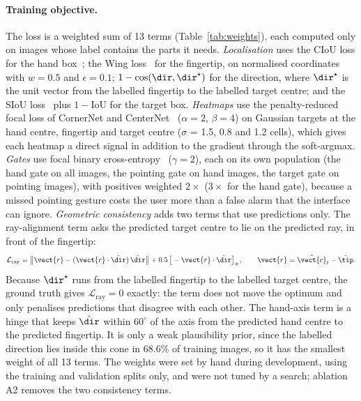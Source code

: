 \paragraph{Training objective.} The loss is a weighted sum of 13 terms (Table~\ref{tab:weights}), each computed only on images whose label contains the parts it needs. \emph{Localisation} uses the CIoU loss for the hand box~\cite{zheng2020distance}; the Wing loss~\cite{feng2018wing} for the fingertip, on normalised coordinates with $w{=}0.5$ and $\epsilon{=}0.1$; $1-\cos(\dir,\dir^\star)$ for the direction, where $\dir^\star$ is the unit vector from the labelled fingertip to the labelled target centre; and the SIoU loss~\cite{gevorgyan2022siou} plus $1-\mathrm{IoU}$ for the target box. \emph{Heatmaps} use the penalty-reduced focal loss of CornerNet and CenterNet~\cite{law2018cornernet,zhou2019objects} ($\alpha{=}2$, $\beta{=}4$) on Gaussian targets at the hand centre, fingertip and target centre ($\sigma$ = 1.5, 0.8 and 1.2 cells), which gives each heatmap a direct signal in addition to the gradient through the soft-argmax. \emph{Gates} use focal binary cross-entropy~\cite{lin2017focal} ($\gamma{=}2$), each on its own population (the hand gate on all images, the pointing gate on hand images, the target gate on pointing images), with positives weighted $2\times$ ($3\times$ for the hand gate), because a missed pointing gesture costs the user more than a false alarm that the interface can ignore. \emph{Geometric consistency} adds two terms that use predictions only. The ray-alignment term asks the predicted target centre to lie on the predicted ray, in front of the fingertip:
\begin{equation}
\mathcal{L}_{\mathrm{ray}} = \big\|\vect{r}-(\vect{r}\cdot\hat{\dir})\,\hat{\dir}\big\| + 0.5\,\big[-\vect{r}\cdot\hat{\dir}\big]_+,\qquad \vect{r}=\hat{\vect{c}}_t-\hat{\tip}.
\end{equation}
Because $\dir^\star$ runs from the labelled fingertip to the labelled target centre, the ground truth gives $\mathcal{L}_{\mathrm{ray}}=0$ exactly: the term does not move the optimum and only penalises predictions that disagree with each other. The hand-axis term is a hinge that keeps $\hat{\dir}$ within $60^\circ$ of the axis from the predicted hand centre to the predicted fingertip. It is only a weak plausibility prior, since the labelled direction lies inside this cone in 68.6\% of training images, so it has the smallest weight of all 13 terms. The weights were set by hand during development, using the training and validation splits only, and were not tuned by a search; ablation A2 removes the two consistency terms.

